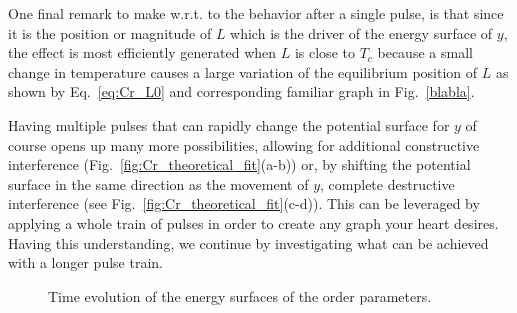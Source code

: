 One final remark to make w.r.t. to the behavior after a single pulse, is that since it is the position or magnitude of $L$ which is the driver of the energy surface of $y$, the effect is most efficiently generated when $L$ is close to $T_c$ because a small change in temperature causes a large variation of the equilibrium position of $L$ as shown by Eq.~\ref{eq:Cr_L0} and corresponding familiar graph in Fig.~\ref{blabla}.    

Having multiple pulses that can rapidly change the potential surface for $y$ of course opens up many more possibilities, allowing for additional constructive interference (Fig.~\ref{fig:Cr_theoretical_fit}(a-b)) or, by shifting the potential surface in the same direction as the movement of $y$, complete destructive interference (see Fig.~\ref{fig:Cr_theoretical_fit}(c-d)).
This can be leveraged by applying a whole train of pulses in order to create any graph your heart desires.
Having this understanding, we continue by investigating what can be achieved with a longer pulse train.
\begin{figure}
	\begin{subfigure}{0.5\textwidth}
	\end{subfigure}
	\begin{subfigure}{0.5\textwidth}
	\end{subfigure}
	\caption{\label{fig:Cr_energy_surfaces} Time evolution of the energy surfaces of the order parameters.}
\end{figure}

